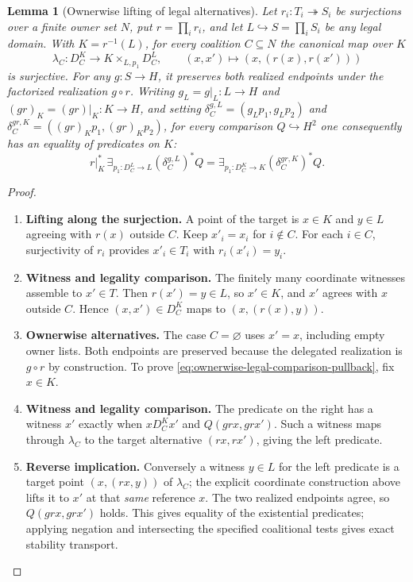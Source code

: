\documentclass[11pt,a4paper]{article}
\numberwithin{equation}{section}
\newtheorem{lemma}[theorem]{Lemma}
\theoremstyle{definition}
\theoremstyle{remark}
\theoremstyle{plain}
\begin{document}
\begin{lemma}[Ownerwise lifting of legal alternatives]
\label{lem:ownerwise-legal-lifting}
Let $r_i:T_i\twoheadrightarrow S_i$ be surjections over a finite owner
set $N$, put $r=\prod_i r_i$, and let $L\hookrightarrow S=\prod_iS_i$
be any legal domain. With $K=r^{-1}(L)$, for every coalition
$C\subseteq N$ the canonical map over $K$
\[
 \lambda_C:D_C^K\longrightarrow K\times_{L,p_1}D_C^L,
 \qquad(x,x')\longmapsto(x,(r(x),r(x')))
\]
is surjective. For any $g:S\to H$, it preserves both realized endpoints under
the factorized realization $g\circ r$. Writing $g_L=g|_L:L\to H$ and $(gr)_K=(gr)|_K:K\to H$,
and setting
$\delta_C^{g,L}=(g_Lp_1,g_Lp_2)$ and
$\delta_C^{gr,K}=((gr)_Kp_1,(gr)_Kp_2)$, for every comparison
$Q\hookrightarrow H^2$ one consequently has an equality of predicates on
$K$:
\begin{equation}
\label{eq:ownerwise-legal-comparison-pullback}
 r|_K^*\,\exists_{p_1:D_C^L\to L}
     (\delta_C^{g,L})^*Q
 =\exists_{p_1:D_C^K\to K}(\delta_C^{gr,K})^*Q.
\end{equation}
\end{lemma}
\begin{proof}
\leavevmode
\begin{enumerate}[label=\textup{(\arabic*)},leftmargin=*,itemsep=4pt,topsep=3pt]
  \item \textbf{Lifting along the surjection.} A point of the target is $x\in K$ and $y\in L$ agreeing with $r(x)$
outside $C$. Keep $x'_i=x_i$ for $i\notin C$. For each $i\in C$,
surjectivity of $r_i$ provides $x'_i\in T_i$ with $r_i(x'_i)=y_i$.
  \item \textbf{Witness and legality comparison.} The finitely many coordinate witnesses assemble to $x'\in T$. Then $r(x')=y\in L$, so $x'\in K$, and $x'$ agrees with $x$ outside
$C$. Hence $(x,x')\in D_C^K$ maps to $(x,(r(x),y))$.
  \item \textbf{Ownerwise alternatives.} The case $C=\varnothing$ uses $x'=x$, including empty owner lists. Both endpoints are preserved because the delegated realization is
$g\circ r$ by construction. To prove \eqref{eq:ownerwise-legal-comparison-pullback}, fix $x\in K$.
  \item \textbf{Witness and legality comparison.} The predicate on the right has a witness $x'$ exactly when
$xD_C^Kx'$ and $Q(grx,grx')$. Such a witness maps through $\lambda_C$
to the target alternative $(rx,rx')$, giving the left predicate.
  \item \textbf{Reverse implication.} Conversely a witness $y\in L$ for the left predicate is a target
point $(x,(rx,y))$ of $\lambda_C$; the explicit coordinate construction
above lifts it to $x'$ at that \emph{same} reference $x$. The two
realized endpoints agree, so $Q(grx,grx')$ holds. This gives equality
of the existential predicates; applying negation and intersecting the
specified coalitional tests gives exact stability transport.
\end{enumerate}
\end{proof}
\end{document}
